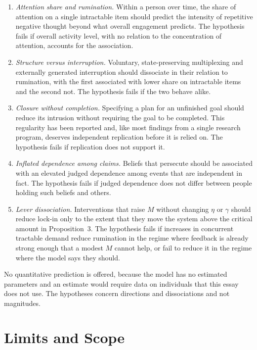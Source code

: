 \documentclass[11pt]{article}
\theoremstyle{definition}
\begin{document}
\begin{enumerate}[leftmargin=2em,itemsep=0.3em]
\item \emph{Attention share and rumination.} Within a person over time, the share of attention on a single intractable item should predict the intensity of repetitive negative thought beyond what overall engagement predicts. The hypothesis fails if overall activity level, with no relation to the concentration of attention, accounts for the association.
\item \emph{Structure versus interruption.} Voluntary, state-preserving multiplexing and externally generated interruption should dissociate in their relation to rumination, with the first associated with lower share on intractable items and the second not. The hypothesis fails if the two behave alike.
\item \emph{Closure without completion.} Specifying a plan for an unfinished goal should reduce its intrusion without requiring the goal to be completed. This regularity has been reported \cite{masicampo2011} and, like most findings from a single research program, deserves independent replication before it is relied on. The hypothesis fails if replication does not support it.
\item \emph{Inflated dependence among claims.} Beliefs that persecute should be associated with an elevated judged dependence among events that are independent in fact. The hypothesis fails if judged dependence does not differ between people holding such beliefs and others.
\item \emph{Lever dissociation.} Interventions that raise $M$ without changing $\eta$ or $\gamma$ should reduce lock-in only to the extent that they move the system above the critical amount in Proposition~3. The hypothesis fails if increases in concurrent tractable demand reduce rumination in the regime where feedback is already strong enough that a modest $M$ cannot help, or fail to reduce it in the regime where the model says they should.
\end{enumerate}

No quantitative prediction is offered, because the model has no estimated parameters and an estimate would require data on individuals that this essay does not use. The hypotheses concern directions and dissociations and not magnitudes.

\section{Limits and Scope}
\label{sec:limits}
\end{document}
